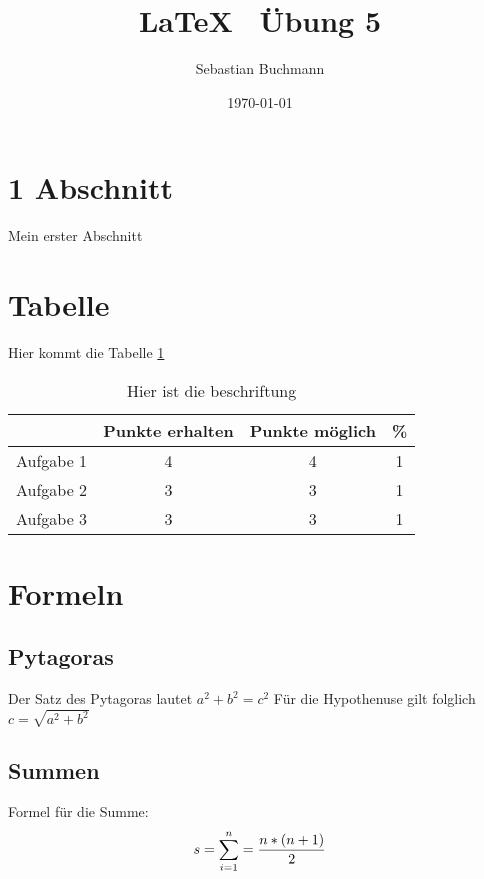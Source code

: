 \documentclass[11pt,a4paper]{article}
\date{\today}
\author{Sebastian Buchmann}
\title{ \LaTeX ~ Übung 5}
\begin{document}
\maketitle
\section{1 Abschnitt}

Mein erster Abschnitt


\section{Tabelle}
Hier kommt die Tabelle \ref{tab:Punkte}
\begin{table} [h]
\centering
\begin{tabular} {c|c|c|c} 

{} & {Punkte erhalten}  & {Punkte möglich} & {\%}   \\
\hline

Aufgabe 1 & 4 & 4 & 1 \\
Aufgabe 2 & 3 & 3 & 1 \\
Aufgabe 3 & 3 & 3 & 1 \\


\end{tabular}

\caption{Hier ist die beschriftung}
\label{tab:Punkte}
\end{table}
\section{Formeln}

\subsection{Pytagoras}
 Der Satz des Pytagoras lautet $ a^2 + b^2 = c^2$ Für die Hypothenuse gilt folglich $c = \sqrt{a^2+b^2}$
 
\subsection{Summen}

Formel für die Summe: \\
\begin{equation}
 s= \sum\limits_{i=1}^{n} = \frac{n*(n+1)}{2}   
\centering
\end{equation}
\end{document}
